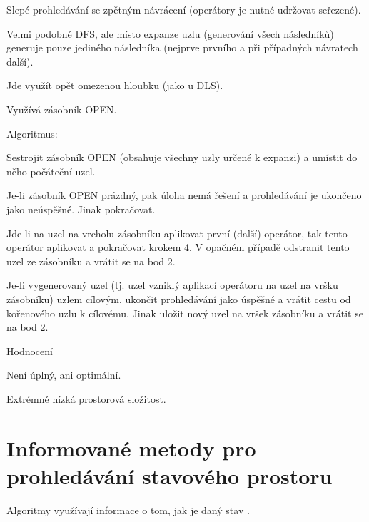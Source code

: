 \begin{compactitem}
    \item Slepé prohledávání se zpětným návrácení (operátory je nutné udržovat seřezené).
    \item Velmi podobné DFS, ale místo expanze uzlu (generování všech následníků) generuje pouze jediného následníka (nejprve prvního a při případných návratech další).
    \item Jde využít opět omezenou hloubku (jako u DLS).
    \item Využívá zásobník OPEN.

    \item Algoritmus: \begin{compactenum}
        \item Sestrojit zásobník OPEN (obsahuje všechny uzly určené k expanzi) a umístit do něho počáteční uzel.
        \item Je-li zásobník OPEN prázdný, pak úloha nemá řešení a prohledávání je ukončeno jako neúspěšné. Jinak pokračovat.
        \item Jde-li na uzel na vrcholu zásobníku aplikovat první (další) operátor, tak tento operátor aplikovat a pokračovat krokem 4. V opačném případě odstranit tento uzel ze zásobníku a vrátit se na bod 2.
        \item Je-li vygenerovaný uzel (tj. uzel vzniklý aplikací operátoru na uzel na vršku zásobníku) uzlem cílovým, ukončit prohledávání jako úspěšné a vrátit cestu od kořenového uzlu k cílovému. Jinak uložit nový uzel na vršek zásobníku a vrátit se na bod 2.
    \end{compactenum}

    \item Hodnocení \begin{compactitem}
        \item Není úplný, ani optimální.
        \item Extrémně nízká prostorová složitost.
    \end{compactitem}
\end{compactitem}


\section{Informované metody pro prohledávání stavového prostoru}

\begin{compactitem}
    \item Algoritmy využívají informace o tom, jak je daný stav .
\end{compactitem}

